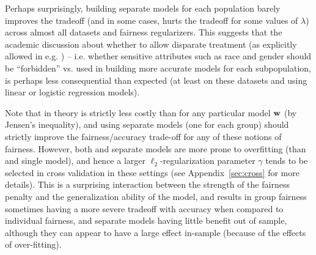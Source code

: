 Perhaps surprisingly, building separate models for each population
barely improves the tradeoff (and in some cases, hurts the
tradeoff for some values of $\lambda$) across almost all datasets and
fairness regularizers. This suggests that the academic discussion
about whether to allow disparate treatment (as explicitly allowed in
e.g. \cite{DworkHPRZ12, JosephKMR16}) -- i.e. whether sensitive
attributes such as race and gender should be ``forbidden'' vs. used in
building more accurate models for each subpopulation, is perhaps less
consequential than expected (at least on these datasets and using
linear or logistic regression models).

Note that in theory \grp is strictly less costly than 
\ind for any particular model $\mathbf{w}$ (by
Jensen's inequality), and using separate models (one for each group)
should strictly improve the fairness/accuracy trade-off for any of
these notions of fairness. However, both \grp and separate models are more prone to overfitting 
(than \ind and single model), and hence a larger $\ell_2$-regularization parameter $\gamma$ 
tends to be selected in cross validation in these settings (see Appendix~\ref{sec:cross} for more details). 
This is a surprising interaction between the strength of the fairness penalty and the generalization ability 
of the model, and results in group fairness sometimes having a more severe tradeoff with accuracy 
when compared to individual fairness, and separate models having little benefit out of sample, although 
they can appear to have a large effect in-sample (because of the effects of over-fitting).


